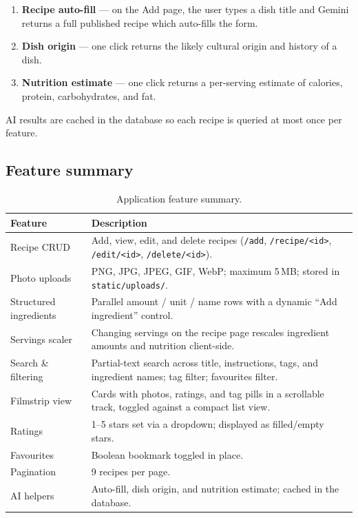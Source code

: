 \documentclass[11pt,a4paper]{article}
\newcommand{\code}[1]{\texttt{#1}}
\begin{document}
\begin{enumerate}[nosep]
  \item \textbf{Recipe auto-fill} --- on the Add page, the user types a dish
        title and Gemini returns a full published recipe which auto-fills the
        form.
  \item \textbf{Dish origin} --- one click returns the likely cultural origin
        and history of a dish.
  \item \textbf{Nutrition estimate} --- one click returns a per-serving estimate
        of calories, protein, carbohydrates, and fat.
\end{enumerate}

AI results are cached in the database so each recipe is queried at most once per
feature.

\subsection{Feature summary}
\begin{table}[h]
\centering
\small
\begin{tabularx}{\textwidth}{@{}lX@{}}
\toprule
\textbf{Feature} & \textbf{Description} \\
\midrule
Recipe CRUD        & Add, view, edit, and delete recipes (\code{/add}, \code{/recipe/<id>}, \code{/edit/<id>}, \code{/delete/<id>}). \\
Photo uploads      & PNG, JPG, JPEG, GIF, WebP; maximum 5\,MB; stored in \code{static/uploads/}. \\
Structured ingredients & Parallel amount / unit / name rows with a dynamic ``Add ingredient'' control. \\
Servings scaler    & Changing servings on the recipe page rescales ingredient amounts and nutrition client-side. \\
Search \& filtering & Partial-text search across title, instructions, tags, and ingredient names; tag filter; favourites filter. \\
Filmstrip view     & Cards with photos, ratings, and tag pills in a scrollable track, toggled against a compact list view. \\
Ratings            & 1--5 stars set via a dropdown; displayed as filled/empty stars. \\
Favourites         & Boolean bookmark toggled in place. \\
Pagination         & 9 recipes per page. \\
AI helpers         & Auto-fill, dish origin, and nutrition estimate; cached in the database. \\
\bottomrule
\end{tabularx}
\caption{Application feature summary.}
\end{table}
\end{document}
